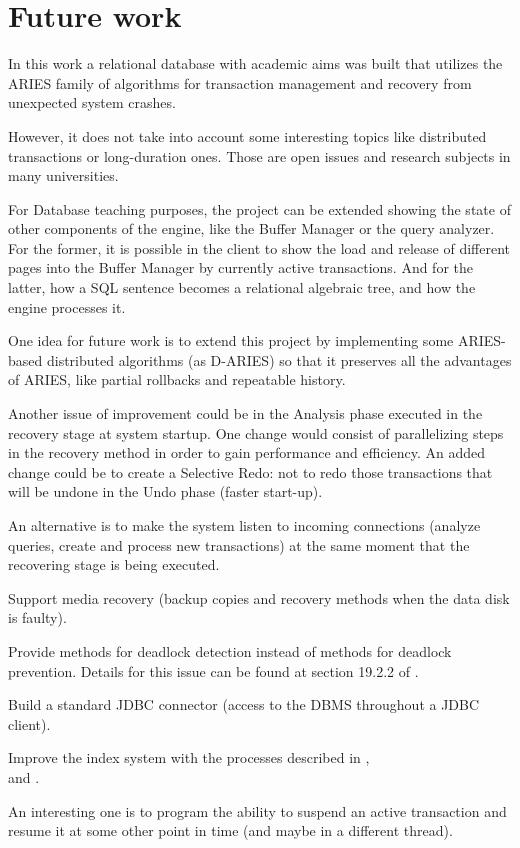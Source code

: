\section{Future work}
In this work a relational database with academic aims was built that utilizes the ARIES family of algorithms for transaction management and recovery from unexpected system crashes.

However, it does not take into account some interesting topics like distributed transactions or long-duration ones. Those are open issues and research subjects in many universities.

For Database teaching purposes, the project can be extended showing the state of other components of the engine, like the Buffer Manager or the query analyzer. For the former, it is possible in the client to show the load and release of different pages into the Buffer Manager by currently active transactions. And for the latter, how a SQL sentence becomes a relational algebraic tree, and how the engine processes it.

One idea for future work is to extend this project by implementing some ARIES-based distributed algorithms (as D-ARIES) so that it preserves all the advantages of ARIES, like partial rollbacks and repeatable history.

Another issue of improvement could be in the Analysis phase executed in the recovery stage at system startup. One change would consist of parallelizing steps in the recovery method in order to gain performance
and efficiency. An added change could be to create a Selective Redo: not to redo those transactions that will be undone in the Undo phase (faster start-up).

An alternative is to make the system listen to incoming connections (analyze queries, create and process new transactions) at the same moment that the recovering stage is being executed.

Support media recovery (backup copies and recovery methods when the data disk is faulty).

Provide methods for deadlock detection instead of methods for deadlock prevention. 
Details for this issue can be found at section 19.2.2 of \cite{RaGh03}.
 
Build a standard JDBC connector (access to the DBMS throughout a JDBC client).

Improve the index system with the processes described in \cite{MoLe92}, \\\cite{Moha90} and \cite{Moha93}.

An interesting one is to program the ability to suspend an active transaction and resume it at some other point in time (and maybe in a different thread).
